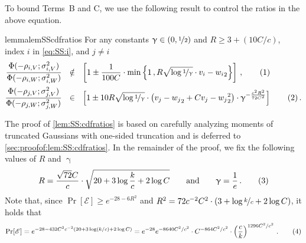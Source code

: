 \documentclass[11pt,letterpaper]{article}
\theoremstyle{plain}
\theoremstyle{definition}
\theoremstyle{remark}
\newcommand{\yesnum}{\addtocounter{equation}{1}\tag{\theequation}}
\newcommand{\qquadtext}[1]{\qquad\text{#1}\qquad}
\newcommand{\qquadand}{\qquadtext{and}}
\newcommand{\sinparen}[1]{\ensuremath{(#1)}}
\newcommand{\inbrace}[1]{\ensuremath{\left\{#1\right\}}}
\newcommand{\inparen}[1]{\ensuremath{\left(#1\right)}}
\newcommand{\insquare}[1]{\ensuremath{\left[#1\right]}}
\let\norm\relax
\newcommand{\norm}[1]{\ensuremath{\left\lVert #1 \right\rVert}}
\newcommand{\evE}{\ensuremath{\mathscr{E}}}
\newcommand{\sfrac}[2]{{#1/#2}}
\newcommand{\nfrac}[2]{\nicefrac{#1}{#2}}
\renewcommand{\gamma}{\upgamma}
\newcommand{\customcdf}[2]{\Phi\sinparen{#1; \sigma_{#2}^2}}
\newcommand{\proofconstant}{{3}}
\begin{document}
{{    To bound Terms~\textsf{B} and \textsf{C}, we use the following result to control the ratios in the above equation.
    \begin{restatable}{lemma}{lemSScdfratios}\label{lem:SS:cdfratios}
        For any constants $\gamma\in (0,\nfrac{1}{2})$ and $R\geq 3 + (\sfrac{10C}{c})$, index $i$ in \cref{eq:SS:i}, and $j\neq i$
        \begin{align*}
                \frac{
                    \customcdf{-\rho_{i,V}}{i,V}
                }{
                    \customcdf{-\rho_{i,W}}{i,W}
                }
                &~~\notin~~ 
                \insquare{
                    1 \pm \frac{1}{100C}\cdot 
                    \min\inbrace{
                        1\,,
                        R \sqrt{\log{\nfrac{1}{\gamma}}}\cdot \norm{v_i-w_i}_2 
                    }
                }\,,
                \yesnum\label{eq:SS:cdfratios:lb}\\
                \frac{\customcdf{-\rho_{j,V}}{j,V}}{\customcdf{-\rho_{j,W}}{j,W}}
                &~~\in~~
                \insquare{
                    1
                    \pm 10R\sqrt{\log{\nfrac{1}{\gamma}}}\cdot 
                    \inparen{\norm{v_j-w_j}_2+C\norm{v_j-w_j}_2^2}
                    \cdot \gamma^{-\frac{c^2R^2}{72C^2}}
                }
                \yesnum\label{eq:SS:cdfratios:ub}
                \,.
        \end{align*}
    \end{restatable}
    The proof of \cref{lem:SS:cdfratios} 
    {is based on carefully analyzing moments of truncated Gaussians with one-sided truncation and is deferred to} 
    \cref{sec:proofof:lem:SS:cdfratios}.
    In the remainder of the proof, we fix the following values of $R$ and $\gamma$  
    \[
        R = \frac{\sqrt{72}C}{c}\cdot \sqrt{
            20 + 3\log{\frac{k}{c}} + 2\log{C}
        }
        \qquadand
        \gamma = \frac{1}{e}\,.
        \yesnum\label{eq:SS:valueRandGamma}
    \] 
    Note that, since $\Pr[\evE]\geq e^{-{28-6R^2}}$ and $R^2={72c^{-2}C^2}\cdot \inparen{
    \proofconstant{} + \log{\nfrac{k}{c}}+ 2\log{C}}$, it holds that
    \[
        \Pr[\evE] 
        =  e^{-28 - 432C^2 c^{-2} (20 + 3 \log(k/c) + 2 \log C)}
        =  e^{-28} e^{-8640 C^2/c^2} \cdot 
            C^{-864 C^2/c^2} \cdot 
            \inparen{\frac{c}{k}}^{1296 C^2/c^2}\,.
        \yesnum\label{eq:SS:IP:lowerBoundOnProb}
    \] 

}}
\end{document}
